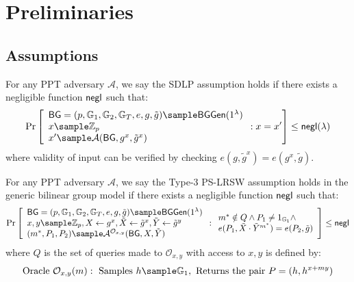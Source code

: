 \newpage
\section{Preliminaries}


\subsection{Assumptions}


\begin{definition}\label{sdlp}
For any PPT adversary $\mathcal{A}$, we say the SDLP assumption holds if there exists a negligible function $\mathsf{negl}$ such that:
$$\Pr\left[\begin{array}{l}
    \BG = (p, \G_1, \G_2, \G_T, e, g, \tilde{g}) \sample \BGGen(1^\lambda) \\
    x \sample \Z_p \\
    x' \sample \mathcal{A}(\BG, g^x, \tilde{g}^x)
\end{array} : x = x'\right] \leq \negl(\lambda)$$
where validity of input can be verified by checking $e(g, \tilde{g}^x) = e(g^x, \tilde{g})$.
\end{definition} 


\begin{definition}
For any PPT adversary $\mathcal{A}$, we say the Type-3 PS-LRSW assumption holds in the generic bilinear group model if there exists a negligible function $\mathsf{negl}$ such that:
$$\Pr\left[\begin{array}{l}
    \BG = (p, \G_1, \G_2, \G_T, e, g, \tilde{g}) \sample \BGGen(1^\lambda) \\
    x,y \sample \Z_p, X \gets g^x, \tilde{X} \gets \tilde{g}^x, \tilde{Y} \gets \tilde{g}^y \\
    (m^*, P_1, P_2) \sample \mathcal{A}^{\mathcal{O}_{x,y}}(\BG, X, \tilde{Y})
\end{array} : \begin{array}{l}
    m^* \notin Q \land P_1 \neq 1_{\G_1} \land \\
    e(P_1, \tilde{X} \cdot \tilde{Y}^{m^*}) = e(P_2, \tilde{g})
\end{array}\right] \leq \negl$$
where $Q$ is the set of queries made to $\mathcal{O}_{x,y}$ with access to $x,y$ is defined by:
\[
\text{Oracle }\mathcal{O}_{x,y}(m): \text{ Samples } h \sample \G_1, \text{ Returns the pair } P = (h, h^{x+my})
\]

\end{definition}






